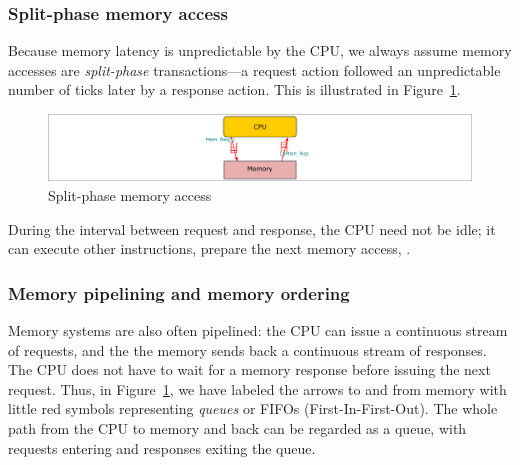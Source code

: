 
\subsubsection{Split-phase memory access}



Because memory latency is unpredictable by the CPU, we always assume
memory accesses are \emph{split-phase} transactions---a request action
followed an unpredictable number of ticks later by a response action.
This is illustrated in Figure~\ref{Fig_BSV_Split_Phase_Mem}.
\begin{figure}[htbp]
\centerline{\includegraphics[width=6in,angle=0]{Figures/Fig_BSV_Split_Phase_Mem}}
\caption{\label{Fig_BSV_Split_Phase_Mem} Split-phase memory access}
\end{figure}
During the interval between request and response, the CPU need not be
idle; it can execute other instructions, prepare the next memory
access, {\etc}.


\subsubsection{Memory pipelining and memory ordering}

Memory systems are also often pipelined: the CPU can issue a
continuous stream of requests, and the the memory sends back a
continuous stream of responses.  The CPU does not have to wait for a
memory response before issuing the next request.  Thus, in
Figure~\ref{Fig_BSV_Split_Phase_Mem}, we have labeled the arrows to
and from memory with little red symbols representing \emph{queues} or
FIFOs (First-In-First-Out).  The whole path from the CPU to memory and
back can be regarded as a queue, with requests entering and responses
exiting the queue.


